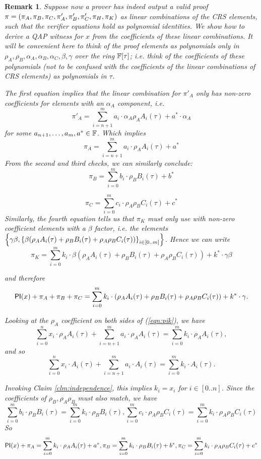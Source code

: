 \documentclass[11pt]{article}
\numberwithin{figure}{section} %
\newtheorem{remark}[thm]{Remark}
\newcommand{\set}[1]{\ensuremath{\left\{#1\right\}}\xspace}
\begin{document}
\begin{remark}
Suppose now a prover has indeed output a valid proof $\pi = (\pi_A,\pi_B,\pi_C,\pi'_A,\pi'_B,\pi'_C,\pi_H,\pi_K)$
as linear combinations of the CRS elements, such that the verifier equations hold as polynomial identities.
We show how to derive a QAP witness for $x$ from the coefficients of these linear combinations. 
It will be convenient here to think of the proof elements as polynomials only in $\rho_A,\rho_B,\alpha_A,\alpha_B,\alpha_C,\beta,\gamma$ over the ring $\mathbb F[\tau]$; i.e. think of the coefficients of these polynomials (not to be confused with the coefficients of the linear combinations of CRS elements) as polynomials in $\tau$.
 

The first equation implies that the linear combination for $\pi'_A$ only has non-zero coefficients for elements with an $\alpha_A$ component, i.e.
\[\pi'_A = \sum_{i=n+1}^m a_i\cdot  \alpha_A\rho_A A_i(\tau) + a^*\cdot \alpha_A \]
for some $a_{n+1},\ldots,a_m,a^* \in \mathbb F$.
Which implies 
\[\pi_A = \sum_{i=n+1}^m a_i \cdot \rho_A A_i(\tau) + a^*\]
From the second and third checks, we can similarly conclude:
\[\pi_B = \sum_{i=0}^m b_i\cdot  \rho_B B_i(\tau) + b^*\]

\[\pi_C = \sum_{i=0}^m c_i \cdot \rho_A\rho_B C_i(\tau) + c^*\]
Similarly, the fourth equation tells us that $\pi_K$ must only use with non-zero coefficient elements with a $\beta$ factor,
i.e. the elements $\set{\gamma\beta,\sett{\beta(\rho_A A_i(\tau) + \rho_B B_i(\tau) + \rho_A\rho_B C_i(\tau))}{i\in[0..m]}}$.
Hence we can write
\[\pi_K = \sum_{i=0}^m k_i\cdot\beta(\rho_A A_i(\tau) + \rho_B B_i(\tau) + \rho_A\rho_B C_i(\tau)) + k^*\cdot \gamma\beta\]

and therefore
\begin{equation}\label{eqn:pik}
\mathsf{PI}(x)+\pi_A +\pi_B+\pi_C= \sum_{i=0}^m k_i\cdot(\rho_A A_i(\tau) + \rho_B B_i(\tau) + \rho_A\rho_B C_i(\tau)) + k^*\cdot \gamma.
\end{equation}

Looking at the $\rho_A$ coefficient on both sides of (\ref{eqn:pik}), we have
\[\sum_{i=0}^n x_i \cdot \rho_A A_i(\tau)+\sum_{i=n+1}^m a_i \cdot \rho_A A_i(\tau) = \sum_{i=0}^m k_i\cdot \rho_A A_i(\tau),\]
and so
\[\sum_{i=0}^n x_i \cdot A_i(\tau)+\sum_{i=n+1}^m a_i \cdot A_i(\tau) = \sum_{i=0}^m k_i \cdot A_i(\tau).\]

Invoking Claim \ref{clm:independence}, this implies $k_i=x_i$ for $i\in[0..n]$.
Since the coefficients of $\rho_B,\rho_A\rho_B$ must also match, we have
\[\sum_{i=0}^m b_i\cdot  \rho_B B_i(\tau)= \sum_{i=0}^m k_i \cdot \rho_B B_i(\tau),\sum_{i=0}^m c_i \cdot \rho_A\rho_B C_i(\tau)=\sum_{i=0}^m k_i \cdot\rho_A\rho_B C_i(\tau) \]
So
\[\mathsf{PI}(x)+\pi_A=\sum_{i=0}^m k_i\cdot \rho_A A_i(\tau)+a^*,\pi_B=\sum_{i=0}^m k_i \cdot \rho_B B_i(\tau)+b^*,\pi_C=\sum_{i=0}^m k_i \cdot \rho_A\rho_B C_i(\tau)+c^*\]



\end{remark}
\end{document}
